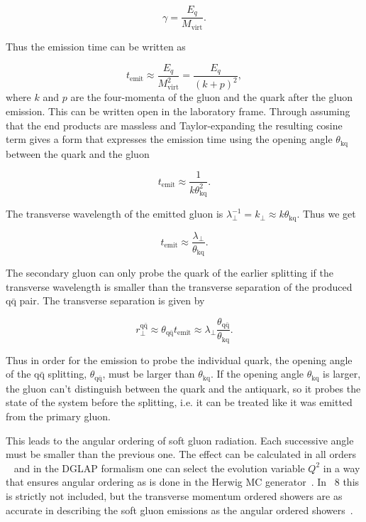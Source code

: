 \begin{equation}
\gamma = \frac{E_q}{M_\mathrm{virt}}.
\end{equation}

\noindent Thus the emission time can be written as

\begin{equation}
t_\mathrm{emit} \approx \frac{E_q}{M_\mathrm{virt}^2}  = \frac{E_q}{\left(k+p\right)^2},
\end{equation}
\noindent where $k$ and $p$ are the four-momenta of the gluon and the quark after the gluon emission. This can be written open in the laboratory frame. Through assuming that the end products are massless and Taylor-expanding the resulting cosine term gives a form that expresses the emission time using the opening angle $\theta_\mathrm{kq}$ between the quark and the gluon


\begin{equation}
t_\mathrm{emit} \approx \frac{1}{k\theta_\mathrm{kq}^2}.
\end{equation}


\noindent The transverse wavelength of the emitted gluon is $\lambda_\perp^{-1}=k_\perp\approx k\theta_\mathrm{kq}$. Thus we get

\begin{equation}
t_\mathrm{emit} \approx \frac{\lambda_\perp}{\theta_\mathrm{kq}}.
\end{equation}

\noindent The secondary gluon can only probe the quark of the earlier splitting if the transverse wavelength is smaller than the transverse separation of the produced $\mathrm{q \bar q}$ pair. The transverse separation is given by

\begin{equation}
r_\perp^{\mathrm{q \bar q}} \approx \theta_\mathrm{q \bar q} t_\mathrm{emit} \approx \lambda_\perp \frac{\theta_\mathrm{q \bar q} }{\theta_\mathrm{k q} }.
\end{equation}

\noindent Thus in order for the emission to probe the individual quark, the opening angle of the $\mathrm{q \bar q}$ splitting, $\theta_\mathrm{q \bar q}$, must be larger than $\theta_\mathrm{k q}$. If the opening angle $\theta_\mathrm{k q}$ is larger, the gluon can't distinguish between the quark and the antiquark, so it probes the state of the system before the splitting, i.e. it can be treated like it was emitted from the primary gluon.  

This leads to the angular ordering of soft gluon radiation. Each successive angle must be smaller than the previous one. The effect can be calculated in all orders ~\cite{basicsofpqcd} and in the DGLAP formalism one can select the evolution variable $Q^2$ in a way that ensures angular ordering as is done in the Herwig MC generator~\cite{herwigManual}. In \pythia~8 this is strictly not included, but the transverse momentum ordered showers are as accurate in describing the soft gluon emissions as the angular ordered showers~\cite{eventGenerators}.




